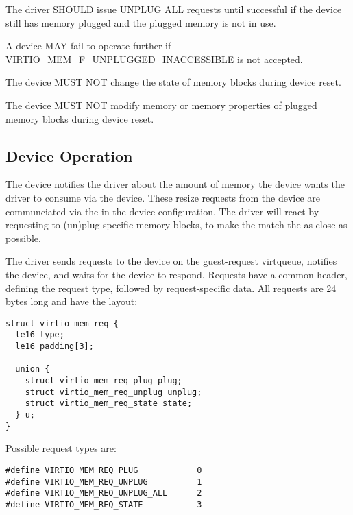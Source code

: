 The driver SHOULD issue UNPLUG ALL requests until successful if the device
still has memory plugged and the plugged memory is not in use.


A device MAY fail to operate further if VIRTIO_MEM_F_UNPLUGGED_INACCESSIBLE
is not accepted.

The device MUST NOT change the state of memory blocks during device reset.

The device MUST NOT modify memory or memory properties of plugged memory
blocks during device reset.

\subsection{Device Operation}\label{sec:Device Types / Memory Device / Device Operation}

The device notifies the driver about the amount of memory the device wants
the driver to consume via the device.  These resize requests from the
device are communciated via the  in the device
configuration.  The driver will react by requesting to (un)plug specific
memory blocks, to make the  match the
 as close as possible.

The driver sends requests to the device on the guest-request virtqueue,
notifies the device, and waits for the device to respond.  Requests have a
common header, defining the request type, followed by request-specific
data.  All requests are 24 bytes long and have the layout:

\begin{lstlisting}
struct virtio_mem_req {
  le16 type;
  le16 padding[3];

  union {
    struct virtio_mem_req_plug plug;
    struct virtio_mem_req_unplug unplug;
    struct virtio_mem_req_state state;
  } u;
}
\end{lstlisting}

Possible request types are:

\begin{lstlisting}
#define VIRTIO_MEM_REQ_PLUG            0
#define VIRTIO_MEM_REQ_UNPLUG          1
#define VIRTIO_MEM_REQ_UNPLUG_ALL      2
#define VIRTIO_MEM_REQ_STATE           3
\end{lstlisting}

